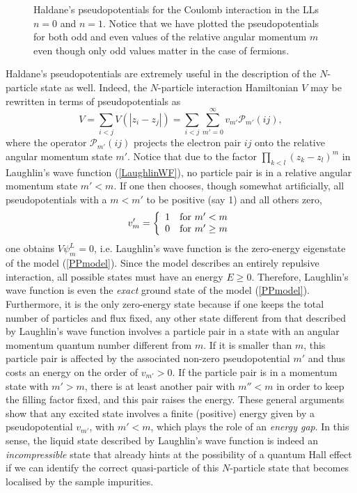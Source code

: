 \documentclass[10pt]{book}
\newcommand{\Pmath}{\mathcal{P}}
\newcommand{\beq}{\begin{equation}}
\newcommand{\eeq}{\end{equation}}
\begin{document}
\begin{figure}
\begin{center}
\end{center}
\caption{ Haldane's pseudopotentials for the Coulomb interaction in the LLs $n=0$ and $n=1$. Notice that we have plotted 
the pseudopotentials for both odd and even values of the relative angular momentum $m$ even though only odd values
matter in the case of fermions.}
\label{fig19bis}
\end{figure}


Haldane's pseudopotentials are extremely useful in the description of the $N$-particle state as well. Indeed, the $N$-particle
interaction Hamiltonian $V$ may be rewritten in terms of pseudopotentials as
\beq\label{IntHam}
V=\sum_{i<j} V(|z_i - z_j|) = \sum_{i<j}\sum_{m'=0}^{\infty}v_{m'} \Pmath_{m'}(ij),
\eeq
where the operator $\Pmath_{m'}(ij)$ projects the electron pair $ij$ onto the relative angular momentum state $m'$.
Notice that due to the factor $\prod_{k<l}(z_k - z_l)^m$ in Laughlin's wave function (\ref{LaughlinWF}), no particle pair
is in a relative angular momentum state $m'<m$. If one then chooses, though somewhat artificially, all pseudopotentials with
a $m<m'$ to be positive (say 1) and all others zero,
\beq\label{PPmodel}
v_m'=\left\{ 
\begin{array}{cc}
1 & {\rm for~} m'<m\\
0 & {\rm for~} m'\geq m
\end{array}\right.
\eeq
one obtains $V\psi_m^L = 0$, i.e. Laughlin's wave function is the zero-energy eigenstate of the model (\ref{PPmodel}). Since the 
model describes an entirely repulsive interaction, all possible states must have an energy $E\geq 0$. Therefore, Laughlin's
wave function is even the {\sl exact} ground state of the model (\ref{PPmodel}). Furthermore, it is the only zero-energy state
because if one keeps the total number of particles and flux fixed, any other state different from that described by Laughlin's 
wave function involves a particle pair in a state with an angular momentum quantum number different from $m$. If it is smaller than
$m$, this particle pair is affected by the associated non-zero pseudopotential $m'$ and thus costs an energy on the order of $v_{m'}>0$.
If the particle pair is in a momentum state with $m'>m$, there is at least another pair with $m''<m$ in order to keep the filling
factor fixed, and this pair raises the energy. These general arguments show that any excited state involves a finite (positive)
energy given by a pseudopotential $v_{m'}$, with $m'<m$, which plays the role of an {\sl energy gap}. In this sense, the 
liquid state described by Laughlin's wave function is indeed an {\sl incompressible} state that already hints at the possibility
of a quantum Hall effect if we can identify the correct quasi-particle of this $N$-particle state that becomes localised by the
sample impurities.
\end{document}

